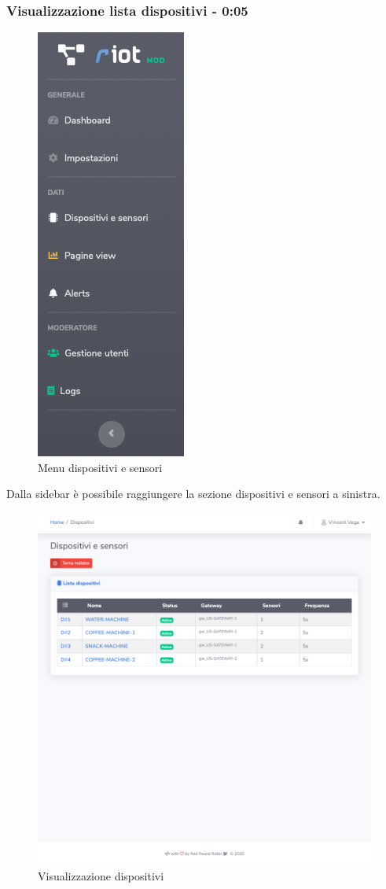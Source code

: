	\subsubsection{Visualizzazione lista dispositivi - 0:05}
		\begin{figure}[H]
		\centering
		\includegraphics[scale=0.600]{res/images/membro/menuDisp.png}
		\caption{Menu dispositivi e sensori}
		\end{figure}
		Dalla sidebar è possibile raggiungere la sezione dispositivi e sensori a sinistra. 
		\begin{figure}[H]
		\centering
		\includegraphics[scale=0.450]{res/images/membro/visDispositivi.png}
		\caption{Visualizzazione dispositivi}
		\end{figure}
